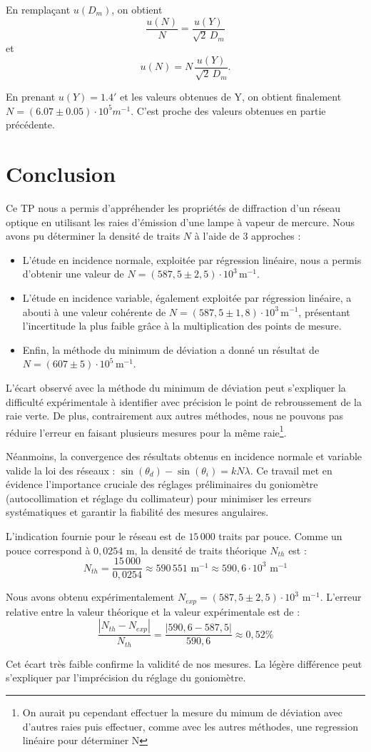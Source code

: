 \documentclass[a4paper,10pt,french]{scrartcl}
\begin{document}
En remplaçant $u(D_m)$, on obtient
\[
\frac{u(N)}{N} = \frac{u(Y)}{\sqrt{2}\,D_m}
\]
et
\[
u(N) = N \,\frac{u(Y)}{\sqrt{2}\,D_m}.
\]

En prenant \(u(Y) = 1.4'\) et les valeurs obtenues de Y, on obtient finalement \(N=(6.07\pm0.05)\cdot10^5 m^{-1}\). C'est proche des valeurs obtenues en partie précédente.
\section{Conclusion}
Ce TP nous a permis d'appréhender les propriétés de diffraction d'un réseau optique en utilisant les raies d'émission d'une lampe à vapeur de mercure. Nous avons pu déterminer la densité de traits $N$ à l'aide de 3 approches :
\begin{itemize}
    \item L'étude en incidence normale, exploitée par régression linéaire, nous a permis d'obtenir une valeur de $N = (587,5 \pm 2,5) \cdot 10^{3} \, \text{m}^{-1}$.
    \item L'étude en incidence variable, également exploitée par régression linéaire, a abouti à une valeur cohérente de $N = (587,5 \pm 1,8) \cdot 10^{3} \, \text{m}^{-1}$, présentant l'incertitude la plus faible grâce à la multiplication des points de mesure.
    \item Enfin, la méthode du minimum de déviation a donné un résultat de $N = (607 \pm 5) \cdot 10^{5} \, \text{m}^{-1}$.
\end{itemize}

L'écart observé avec la méthode du minimum de déviation peut s'expliquer la difficulté expérimentale à identifier avec précision le point de rebroussement de la raie verte. De plus, contrairement aux autres méthodes, nous ne pouvons pas réduire l'erreur en faisant plusieurs mesures pour la m\^eme raie\footnote{On aurait pu cependant effectuer la mesure du mimum de déviation avec d'autres raies puis effectuer, comme avec les autres méthodes, une regression linéaire pour déterminer N}.

Néanmoins, la convergence des résultats obtenus en incidence normale et variable valide la loi des réseaux : $\sin(\theta_d) - \sin(\theta_i) = kN\lambda$. Ce travail met en évidence l'importance cruciale des réglages préliminaires du goniomètre (autocollimation et réglage du collimateur) pour minimiser les erreurs systématiques et garantir la fiabilité des mesures angulaires.


L'indication fournie pour le réseau est de $15\,000$ traits par pouce. Comme un pouce correspond à  $0,0254$ m, la densité de traits théorique $N_{th}$ est :
\[
N_{th} = \frac{15\,000}{0,0254} \approx 590\,551 \text{ m}^{-1} \approx 590,6 \cdot 10^3 \text{ m}^{-1}
\]

Nous avons obtenu expérimentalement $N_{exp} = (587,5 \pm 2,5) \cdot 10^3 \text{ m}^{-1}$. L'erreur relative entre la valeur théorique et la valeur expérimentale est de :
\[
\frac{|N_{th} - N_{exp}|}{N_{th}} = \frac{|590,6 - 587,5|}{590,6} \approx 0,52\%
\]

Cet écart très faible confirme la validité de nos mesures. La légère différence peut s'expliquer par l'imprécision du réglage du goniomètre.
\end{document}
